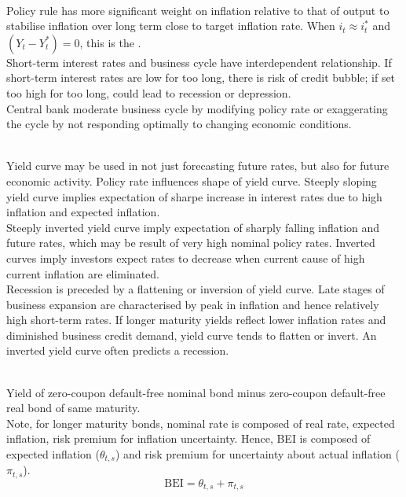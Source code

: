 \begin{remark} \\
Policy rule has more significant weight on inflation relative to that of output to stabilise inflation over long term close to target inflation rate. When $i_t \approx i_t^{*}$ and $(Y_t - Y_t^{*})=0$, this is the .\\
Short-term interest rates and business cycle have interdependent relationship. If short-term interest rates are low for too long, there is risk of credit bubble; if set too high for too long, could lead to recession or depression.\\
Central bank moderate business cycle by modifying policy rate or exaggerating the cycle by not responding optimally to changing economic conditions.
\end{remark}

\begin{remark} \\
Yield curve may be used in not just forecasting future rates, but also for future economic activity. Policy rate influences shape of yield curve. Steeply sloping yield curve implies expectation of sharpe increase in interest rates due to high inflation and expected inflation.\\
Steeply inverted yield curve imply expectation of sharply falling inflation and future rates, which may be result of very high nominal policy rates. Inverted curves imply investors expect rates to decrease when current cause of high current inflation are eliminated.\\
Recession is preceded by a flattening or inversion of yield curve. Late stages of business expansion are characterised by peak in inflation and hence relatively high short-term rates. If longer maturity yields reflect lower inflation rates and diminished business credit demand, yield curve tends to flatten or invert. An inverted yield curve often predicts a recession.
\end{remark}

\begin{definition} \\
Yield of zero-coupon default-free nominal bond minus zero-coupon default-free real bond of same maturity.\\
Note, for longer maturity bonds, nominal rate is composed of real rate, expected inflation, risk premium for inflation uncertainty. Hence, BEI is composed of expected inflation ($\theta_{t,s}$) and risk premium for uncertainty about actual inflation ($\pi_{t,s}$).
\begin{equation}
\text{BEI} = \theta_{t,s} + \pi_{t,s} \nonumber
\end{equation}
\end{definition}

